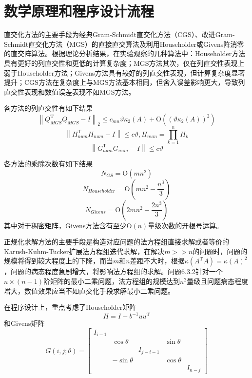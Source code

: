\documentclass[UTF8,a4paper,10pt]{ctexart}
\begin{document}
    \section{数学原理和程序设计流程}
        \par
        直交化方法的主要手段为经典Gram-Schmidt直交化方法（CGS）、改进Gram-Schmidt直交化方法（MGS）的直接直交算法及利用Householder或Givens阵消零的直交阵算法。根据理论分析结果，在实验观察的几种算法中：Householder方法具有更好的列直交性和更低的计算复杂度；MGS方法其次，仅在列直交性表现上弱于Householder方法；Givens方法具有较好的列直交性表现，但计算复杂度显著提升；CGS方法在复杂度上与MGS方法基本相同，但舍入误差影响更大，导致列直交性表现和数值误差表现不如MGS方法。
        \par
        各方法的列直交性有如下结果
        $$
        \left\|Q_{MGS}^{\mathrm{T}}Q_{MGS}-I\right\|_2\le c_{mn}\vartheta\kappa_2(A)+\mathrm{O}((\vartheta\kappa_2(A))^2)
        $$
        $$
        \left\|H_{num}^{\mathrm{T}}H_{num}-I\right\|\le c\vartheta,H_{num}=\prod_{k=1}^{n}H_k
        $$
        $$
        \left\|G_{num}^{\mathrm{T}}G_{num}-I\right\|\le c\vartheta
        $$
        \par
        各方法的乘除次数有如下结果
        $$
        N_{GS}=\mathrm{O}(mn^2)
        $$
        $$
        N_{Householder}=\mathrm{O}\left(mn^2-\frac{n^3}{3}\right)
        $$
        $$
        N_{Givens}=\mathrm{O}\left(2mn^2-\frac{2n^3}{3}\right)
        $$
        其中对于稠密矩阵，Givens方法含有至少$\mathrm{O}(n)$量级次数的开根号运算。
        \par
        正规化求解方法的主要手段是构造对应问题的法方程组直接求解或者等价的Karush-Kuhm-Tucker扩展法方程组迭代求解，在解决$m>>n$的问题时，问题的规模将得到较大程度上的下降，而当$m$和$n$差距不大时，根据$\kappa(A^\mathrm{T}A)= \kappa(A)^2$，问题的病态程度急剧增大，将影响法方程组的求解。问题6.3.2针对一个$n\times(n-1)$阶矩阵的最小二乘问题，法方程组的规模达到$n^2$量级且问题病态程度增大，数值效果应当不如直交化手段求解最小二乘问题。
        \par
        在程序设计上，重点考虑了Householder矩阵
        $$
        H=I-b^{-1}uu^{\mathrm{T}}
        $$
        和Givens矩阵
        $$
        G(i,j;\theta)=
        \begin{bmatrix}
            I_{i-1} & \ & \ & \ & \ \\
            \ & \cos\theta & \ & \sin\theta & \ \\
            \ & \ & I_{j-i-1} & \ & \ \\
            \ & -\sin\theta & \ & \cos\theta & \ \\
            \ & \ & \ & \ & I_{n-j}
        \end{bmatrix}
        $$
\end{document}
